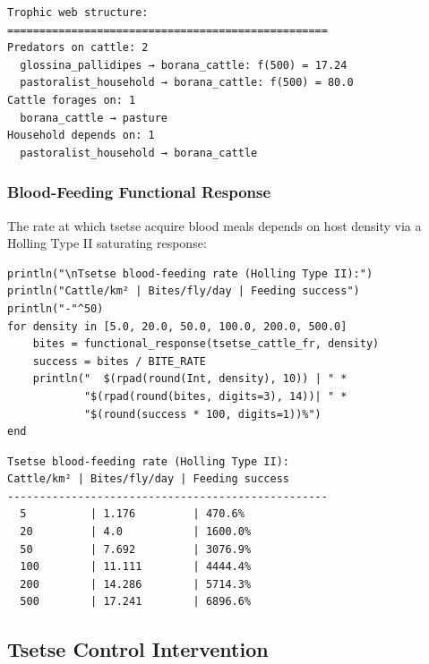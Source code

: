 \begin{verbatim}
Trophic web structure:
==================================================
Predators on cattle: 2
  glossina_pallidipes → borana_cattle: f(500) = 17.24
  pastoralist_household → borana_cattle: f(500) = 80.0
Cattle forages on: 1
  borana_cattle → pasture
Household depends on: 1
  pastoralist_household → borana_cattle
\end{verbatim}



\subsubsection{Blood-Feeding Functional Response}



\label{7902603845023492370}{}


The rate at which tsetse acquire blood meals depends on host density via a Holling Type II saturating response:




\begin{verbatim}
println("\nTsetse blood-feeding rate (Holling Type II):")
println("Cattle/km² | Bites/fly/day | Feeding success")
println("-"^50)
for density in [5.0, 20.0, 50.0, 100.0, 200.0, 500.0]
    bites = functional_response(tsetse_cattle_fr, density)
    success = bites / BITE_RATE
    println("  $(rpad(round(Int, density), 10)) | " *
            "$(rpad(round(bites, digits=3), 14))| " *
            "$(round(success * 100, digits=1))%")
end
\end{verbatim}




\begin{verbatim}
Tsetse blood-feeding rate (Holling Type II):
Cattle/km² | Bites/fly/day | Feeding success
--------------------------------------------------
  5          | 1.176         | 470.6%
  20         | 4.0           | 1600.0%
  50         | 7.692         | 3076.9%
  100        | 11.111        | 4444.4%
  200        | 14.286        | 5714.3%
  500        | 17.241        | 6896.6%
\end{verbatim}



\subsection{Tsetse Control Intervention}



\label{5168761829708472354}{}


